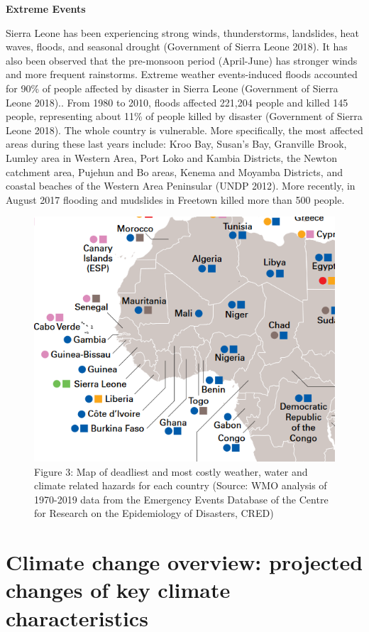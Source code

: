 \documentclass[
]{book}
\begin{document}
\textbf{Extreme Events}

Sierra Leone has been experiencing strong winds, thunderstorms, landslides, heat waves, floods, and seasonal drought (Government of Sierra Leone 2018). It has also been observed that the pre-monsoon period (April-June) has stronger winds and more frequent rainstorms. Extreme weather events-induced floods accounted for 90\% of people affected by disaster in Sierra Leone (Government of Sierra Leone 2018).. From 1980 to 2010, floods affected 221,204 people and killed 145 people, representing about 11\% of people killed by disaster (Government of Sierra Leone 2018). The whole country is vulnerable. More specifically, the most affected areas during these last years include: Kroo Bay, Susan's Bay, Granville Brook, Lumley area in Western Area, Port Loko and Kambia Districts, the Newton catchment area, Pujehun and Bo areas, Kenema and Moyamba Districts, and coastal beaches of the Western Area Peninsular (UNDP 2012). More recently, in August 2017 flooding and mudslides in Freetown killed more than 500 people.

\begin{figure}
\centering
\includegraphics{images/hazard-map.png}
\caption{Figure 3: Map of deadliest and most costly weather, water and climate related hazards for each country (Source: WMO analysis of 1970-2019 data from the Emergency Events Database of the Centre for Research on the Epidemiology of Disasters, CRED)}
\end{figure}

\hypertarget{climate-change-overview-projected-changes-of-key-climate-characteristics}{%
\section{Climate change overview: projected changes of key climate characteristics}\label{climate-change-overview-projected-changes-of-key-climate-characteristics}}
\end{document}
